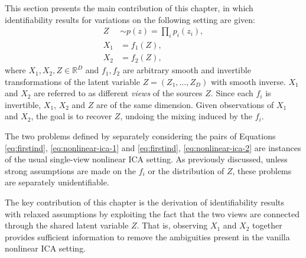 This section presents the main contribution of this chapter, in which identifiability results for variations on the following setting are given:
\begin{align}
Z &\sim p(z) = \prod_{i} p_i(z_i), \label{eq:firstind}\\
X_1 &= f_1(Z), \label{eq:nonlinear-ica-1}\\
X_2 &= f_2(Z), \label{eq:nonlinear-ica-2}
\end{align}
where $X_1, X_2, Z \in \mathbb{R}^D$ and $f_1, f_2$ are arbitrary smooth and invertible transformations of the latent variable $Z = (Z_1, \ldots, Z_D)$ with smooth inverse.
$X_1$ and $X_2$ are referred to as different \emph{views} of the sources $Z$.
Since each $f_i$ is invertible, $X_1$, $X_2$ and $Z$ are of the same dimension.
Given observations of $X_1$ and $X_2$, the goal is to recover $Z$, undoing the mixing induced by the $f_i$.

The two problems defined by separately considering the pairs of Equations \ref{eq:firstind}, \ref{eq:nonlinear-ica-1} and \ref{eq:firstind}, \ref{eq:nonlinear-ica-2} are instances of the usual single-view nonlinear ICA setting.
As previously discussed, unless strong assumptions are made on the $f_i$ or the distribution of $Z$, these problems are separately unidentifiable. 

The key contribution of this chapter is 
the derivation of
identifiability results 
with relaxed assumptions by exploiting the fact that the 
two views are connected through the shared latent variable $Z$. 
That is, observing $X_1$ and $X_2$ together provides sufficient information to remove the ambiguities present in the vanilla nonlinear ICA setting.



